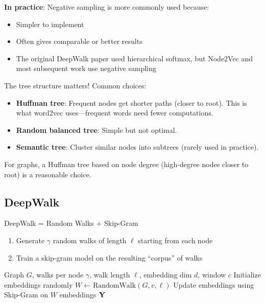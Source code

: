 \begin{notechapter}
\begin{keyinsight}
\textbf{In practice}: Negative sampling is more commonly used because:
\begin{itemize}
    \item Simpler to implement
    \item Often gives comparable or better results
    \item The original DeepWalk paper used hierarchical softmax, but Node2Vec and most subsequent work use negative sampling
\end{itemize}
\end{keyinsight}

\begin{remark}
The tree structure matters! Common choices:
\begin{itemize}
    \item \textbf{Huffman tree}: Frequent nodes get shorter paths (closer to root). This is what word2vec uses---frequent words need fewer computations.
    \item \textbf{Random balanced tree}: Simple but not optimal.
    \item \textbf{Semantic tree}: Cluster similar nodes into subtrees (rarely used in practice).
\end{itemize}
For graphs, a Huffman tree based on node degree (high-degree nodes closer to root) is a reasonable choice.
\end{remark}

\subsection{DeepWalk}

\begin{definition}[DeepWalk]
DeepWalk = Random Walks + Skip-Gram
\begin{enumerate}
    \item Generate $\gamma$ random walks of length $\ell$ starting from each node
    \item Train a skip-gram model on the resulting ``corpus'' of walks
\end{enumerate}
\end{definition}

\begin{algorithm}
\caption{DeepWalk}
\begin{algorithmic}[1]
\Require Graph $G$, walks per node $\gamma$, walk length $\ell$, embedding dim $d$, window $c$
\State Initialize embeddings randomly
        \State $W \gets \text{RandomWalk}(G, v, \ell)$ 
        \State Update embeddings using Skip-Gram on $W$
    \EndFor
\EndFor
\State \Return embeddings $\mathbf{Y}$
\end{algorithmic}
\end{algorithm}


\end{notechapter}
